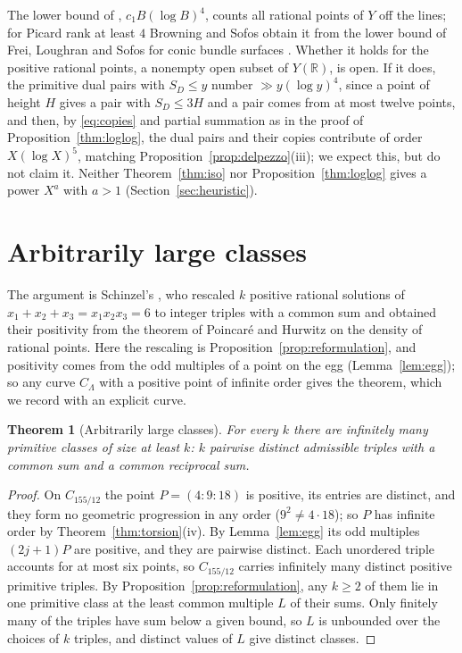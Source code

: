 \documentclass[11pt]{amsart}
\newtheorem{theorem}{Theorem}[section]
\theoremstyle{definition}
\theoremstyle{remark}
\newcommand{\R}{\mathbb{R}}
\begin{document}
The lower bound of \cite[Thm~1.1]{browningsofos2019}, $c_1B(\log B)^4$, counts all rational points of $Y$ off the lines; for Picard rank at least $4$ Browning and Sofos obtain it from the lower bound of Frei, Loughran and Sofos for conic bundle surfaces \cite[\S3]{browningsofos2019}. Whether it holds for the positive rational points, a nonempty open subset of $Y(\R)$, is open. If it does, the primitive dual pairs with $S_D\le y$ number $\gg y(\log y)^4$, since a point of height $H$ gives a pair with $S_D\le3H$ and a pair comes from at most twelve points, and then, by \eqref{eq:copies} and partial summation as in the proof of Proposition~\ref{thm:loglog}, the dual pairs and their copies contribute of order $X(\log X)^5$, matching Proposition~\ref{prop:delpezzo}(iii); we expect this, but do not claim it. Neither Theorem~\ref{thm:iso} nor Proposition~\ref{thm:loglog} gives a power $X^a$ with $a>1$ (Section~\ref{sec:heuristic}).

\section{Arbitrarily large classes}\label{sec:fibres}

The argument is Schinzel's \cite[pp.~587--588]{schinzel1996}, who rescaled $k$ positive rational solutions of $x_1+x_2+x_3=x_1x_2x_3=6$ to integer triples with a common sum and obtained their positivity from the theorem of Poincar\'e and Hurwitz on the density of rational points. Here the rescaling is Proposition~\ref{prop:reformulation}, and positivity comes from the odd multiples of a point on the egg \cite[p.~119]{bgn1993} (Lemma~\ref{lem:egg}); so any curve $C_\Lambda$ with a positive point of infinite order gives the theorem, which we record with an explicit curve.

\begin{theorem}[Arbitrarily large classes]\label{thm:largefibres}
For every $k$ there are infinitely many primitive classes of size at least $k$: $k$ pairwise distinct admissible triples with a common sum and a common reciprocal sum.
\end{theorem}

\begin{proof}
On $C_{155/12}$ the point $P=(4:9:18)$ is positive, its entries are distinct, and they form no geometric progression in any order ($9^2\ne4\cdot18$); so $P$ has infinite order by Theorem~\ref{thm:torsion}(iv). By Lemma~\ref{lem:egg} its odd multiples $(2j+1)P$ are positive, and they are pairwise distinct. Each unordered triple accounts for at most six points, so $C_{155/12}$ carries infinitely many distinct positive primitive triples. By Proposition~\ref{prop:reformulation}, any $k\ge2$ of them lie in one primitive class at the least common multiple $L$ of their sums. Only finitely many of the triples have sum below a given bound, so $L$ is unbounded over the choices of $k$ triples, and distinct values of $L$ give distinct classes.
\end{proof}
\end{document}
